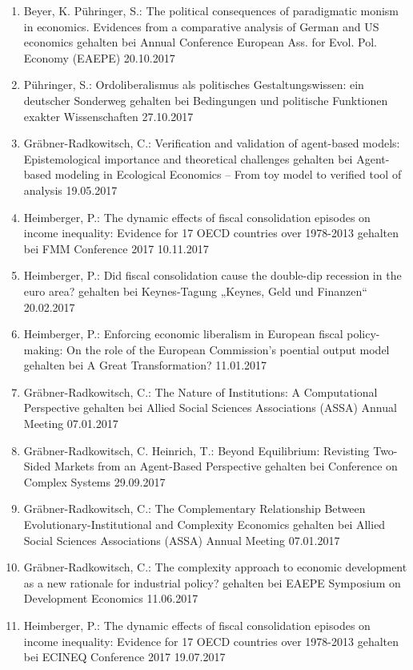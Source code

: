 \begin{enumerate}
	\item Beyer, K. Pühringer, S.: The political consequences of paradigmatic monism in economics. Evidences from a comparative analysis of German and US economics gehalten bei Annual Conference European Ass. for Evol. Pol. Economy (EAEPE) 20.10.2017
	\item Pühringer, S.: Ordoliberalismus als politisches Gestaltungswissen: ein deutscher Sonderweg gehalten bei Bedingungen und politische Funktionen exakter Wissenschaften 27.10.2017
	\item Gräbner-Radkowitsch, C.: Verification and validation of agent-based models: Epistemological importance and theoretical challenges gehalten bei Agent-based modeling in Ecological Economics -- From toy model to verified tool of analysis 19.05.2017
	\item Heimberger, P.: The dynamic effects of fiscal consolidation episodes on income inequality: Evidence for 17 OECD countries over 1978-2013 gehalten bei FMM Conference 2017 10.11.2017
	\item Heimberger, P.: Did fiscal consolidation cause the double-dip recession in the euro area? gehalten bei Keynes-Tagung „Keynes, Geld und Finanzen“ 20.02.2017
	\item Heimberger, P.: Enforcing economic liberalism in European fiscal policy-making: On the role of the European Commission’s poential output model gehalten bei A Great Transformation? 11.01.2017
	\item Gräbner-Radkowitsch, C.: The Nature of Institutions: A Computational Perspective gehalten bei Allied Social Sciences Associations (ASSA) Annual Meeting 07.01.2017
	\item Gräbner-Radkowitsch, C. Heinrich, T.: Beyond Equilibrium: Revisting Two-Sided Markets from an Agent-Based Perspective gehalten bei Conference on Complex Systems 29.09.2017
	\item Gräbner-Radkowitsch, C.: The Complementary Relationship Between Evolutionary-Institutional and Complexity Economics gehalten bei Allied Social Sciences Associations (ASSA) Annual Meeting 07.01.2017
	\item Gräbner-Radkowitsch, C.: The complexity approach to economic development as a new rationale for industrial policy? gehalten bei EAEPE Symposium on Development Economics 11.06.2017
	\item Heimberger, P.: The dynamic effects of fiscal consolidation episodes on income inequality: Evidence for 17 OECD countries over 1978-2013 gehalten bei ECINEQ Conference 2017 19.07.2017

\end{enumerate}

